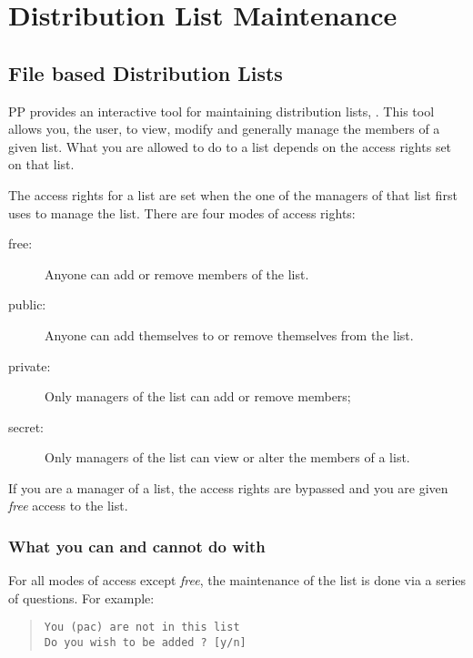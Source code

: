 
\chapter {Distribution List Maintenance}

\section{File based Distribution Lists}

PP provides an interactive tool for maintaining distribution lists,
.
This tool allows you, the user, to view, modify and generally manage
the members of a given list. 
What you are allowed to do to a list depends on the access rights
set on that list.

The access rights for a list are set when the one of the managers of that list
first uses  to manage the list.
There are four modes of access rights:
\begin{description}
\item [free:] Anyone can add or remove members of the list.
\item [public:] Anyone can add themselves to or remove themselves from the list.
\item [private:] Only managers of the list can add or remove members;
\item [secret:] Only managers of the list can view or alter the members
of a list.
\end{description}
If you are a manager of a list, the access rights are bypassed and you
are given {\em free} access to the list.


\subsection	{What you can and cannot do with }

For all modes of access except {\em free}, the maintenance of the
list is done via a series of questions.
For example:
\begin{quote}\small\begin{verbatim}
You (pac) are not in this list
Do you wish to be added ? [y/n]
\end{verbatim}\end{quote}

